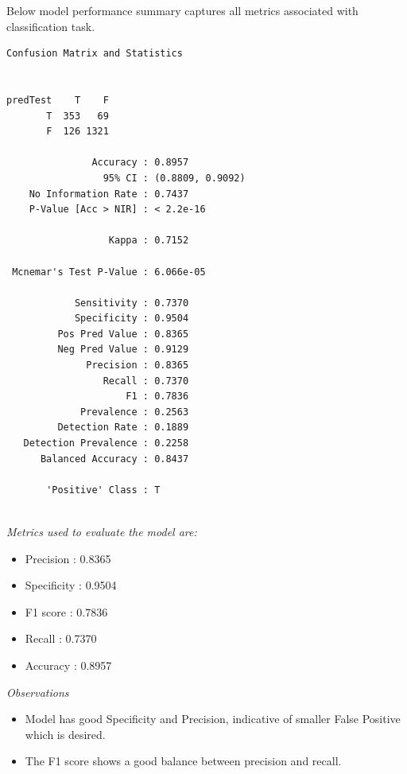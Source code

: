 \documentclass[
]{article}
\providecommand{\tightlist}{%
  \setlength{\itemsep}{0pt}\setlength{\parskip}{0pt}}
\begin{document}
Below model performance summary captures all metrics associated with
classification task.

\begin{verbatim}
Confusion Matrix and Statistics

        
predTest    T    F
       T  353   69
       F  126 1321
                                          
               Accuracy : 0.8957          
                 95% CI : (0.8809, 0.9092)
    No Information Rate : 0.7437          
    P-Value [Acc > NIR] : < 2.2e-16       
                                          
                  Kappa : 0.7152          
                                          
 Mcnemar's Test P-Value : 6.066e-05       
                                          
            Sensitivity : 0.7370          
            Specificity : 0.9504          
         Pos Pred Value : 0.8365          
         Neg Pred Value : 0.9129          
              Precision : 0.8365          
                 Recall : 0.7370          
                     F1 : 0.7836          
             Prevalence : 0.2563          
         Detection Rate : 0.1889          
   Detection Prevalence : 0.2258          
      Balanced Accuracy : 0.8437          
                                          
       'Positive' Class : T               
                                          
\end{verbatim}

\emph{Metrics used to evaluate the model are:}

\begin{itemize}
\tightlist
\item
  Precision : 0.8365
\item
  Specificity : 0.9504
\item
  F1 score : 0.7836
\item
  Recall : 0.7370
\item
  Accuracy : 0.8957
\end{itemize}

\emph{Observations}

\begin{itemize}
\tightlist
\item
  Model has good Specificity and Precision, indicative of smaller False
  Positive which is desired.
\item
  The F1 score shows a good balance between precision and recall.
\end{itemize}
\end{document}

